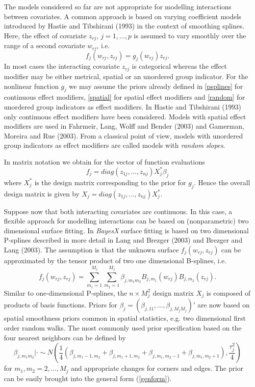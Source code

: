 The models considered so far are not appropriate for modelling
interactions between covariates. A common approach is based on
varying coefficient models introduced by Hastie and Tibshirani
(1993) in the context of smoothing splines. Here, the effect of
covariate $z_{rj}$, $j=1,\dots,p$ is assumed to vary smoothly over
the range of a second covariate $w_{rj}$, i.e.
\begin{equation}
\label{varcoeffterm} f_j(w_{rj},z_{rj}) = g_j(w_{rj}) z_{rj}.
\end{equation}
In most cases the interacting covariate $z_{rj}$ is categorical
whereas the effect modifier may be either metrical, spatial or an
unordered group indicator. For the nonlinear function $g_j$ we may
assume the priors already defined in \autoref{psplines} for
continuous effect modifiers, \autoref{spatial} for spatial effect
modifiers and \autoref{random} for unordered group indicators as
effect modifiers. In Hastie and Tibshirani (1993) only continuous
effect modifiers have been considered. Models with spatial effect
modifiers are used in Fahrmeir, Lang, Wolff and Bender (2003) and
Gamerman, Moreira and Rue (2003). From a classical point of view,
models with unordered group indicators as effect modifiers are
called models with {\em random slopes}.

In matrix notation we obtain for the vector of function
evaluations
$$
f_j = diag(z_{1j},\dots,z_{nj})  X_j^* \beta_j
$$
where $X_j^*$ is the design matrix corresponding to the prior for
$g_j$. Hence the overall design matrix is given by $X_j =
diag(z_{1j},\dots,z_{nj})  X_j^*$.

Suppose now that both interacting covariates are continuous. In
this case, a flexible approach for modelling interactions can be
based on (nonparametric) two dimensional surface fitting. In {\em
BayesX} surface fitting is based on two dimensional P-splines
described in more detail in Lang and Brezger (2003) and Brezger
and Lang (2003). The assumption is that the unknown surface
$f_j(w_{rj},z_{rj})$ can be approximated by the tensor product of
two one dimensional B-splines, i.e.
$$
f_{j}(w_{rj},z_{rj}) = \sum_{m_1=1}^{M_j} \sum_{m_2=1}^{M_j}
\beta_{j,m_1 m_2} B_{j, m_1}(w_{rj}) B_{j,m_2} (z_{rj}).
$$
Similar to one-dimensional P-splines, the $n \times M_j^2$ design
matrix $X_j$ is composed of products of basis functions. Priors
for $\beta_{j} = (\beta_{j,11},\dots,\beta_{j,M_jM_j})'$ are now
based on spatial smoothness priors common in spatial statistics,
e.g. two dimensional first order random walks. The most commonly
used prior specification based on the four nearest neighbors can
be defined by
\begin{equation}
\label{2dimrw1} \beta_{j, m_1 m_2} | \cdot \sim N \left(
\frac{1}{4} ( \beta_{j, m_1-1,m_2}+ \beta_{j, m_1+1,m_2} +
\beta_{j, m_1,m_2-1} +\beta_{j, m_1,m_2+1}),\frac{\tau^2_{j}}{4}
\right)
\end{equation}
for $m_1,m_2=2,\dots,M_j$ and appropriate changes for corners and
edges. The prior can be easily brought into the general form
(\ref{genform}).


